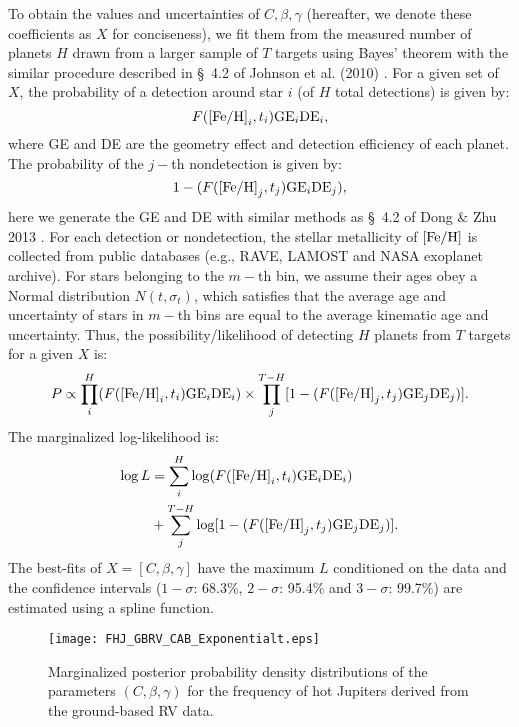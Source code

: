 \documentclass[twocolumn]{pnas-new}
\begin{document}
To obtain the values and uncertainties of $C, \beta, \gamma$ (hereafter, we denote these coefficients as $X$ for conciseness), we fit them from the measured number of planets $H$ drawn from a larger sample of $T$ targets using Bayes’ theorem with the similar procedure described in \S~4.2 of Johnson et al. (2010) \citep{2010PASP..122..905J}.
For a given set of $X$, the probability of a detection around star $i$ (of $H$ total detections) is given by:
\begin{equation*}
  F ({\rm [Fe/H]}_i, t_i) {\rm GE}_i {\rm DE}_{i},
\end{equation*}
where GE and DE are the geometry effect and detection efficiency of each planet.
The probability of the $j-$th nondetection is given by:
\begin{equation*}
  1-(F ({\rm [Fe/H]}_j, t_j) {\rm GE}_i {\rm DE}_{j}),
\end{equation*} 
here we generate the GE and DE with similar methods as \S~4.2 of Dong \& Zhu 2013 \citep{2013ApJ...778...53D}.
For each detection or nondetection, the stellar metallicity of $\rm [Fe/H]$ is collected from public databases (e.g., RAVE, LAMOST and NASA exoplanet archive).
For stars belonging to the $m-$th bin, we assume their ages obey a Normal distribution $N (t, \sigma_t)$, which satisfies that the average age and uncertainty of stars in $m-$th bins are equal to the average kinematic age and uncertainty.
Thus, the possibility/likelihood of detecting $H$ planets from $T$ targets for a given $X$ is:
\begin{equation}
  P \propto \prod \limits_{i}^{H} (F ({\rm [Fe/H]}_i, t_i) {\rm GE}_i {\rm DE}_{i}) \times \prod \limits_{j}^{T-H} [1-(F ({\rm [Fe/H]}_j, t_j) {\rm GE}_j {\rm DE}_{j})].
\end{equation}
The marginalized log-likelihood is:
\begin{equation}
\begin{split}
  \log L & = \sum \limits_{i}^{H} \log(F ({\rm [Fe/H]}_i, t_i) {\rm GE}_i {\rm DE}_{i}) \\
  & + \sum \limits_{j}^{T-H} \log[1-(F ({\rm [Fe/H]}_j, t_j) {\rm GE}_j {\rm DE}_{j})].
\end{split}
\end{equation}
The best-fits of $X=[C, \beta, \gamma]$ have the maximum $L$ conditioned on the data and the confidence intervals
($1-\sigma$: 68.3\%, $2-\sigma$: 95.4\% and $3-\sigma$: 99.7\%) are estimated using a spline function.

\begin{figure}[!t]
\centering
\texttt{[image: FHJ\_GBRV\_CAB\_Exponentialt.eps]}
\caption{Marginalized posterior probability density distributions of the parameters $(C, \beta, \gamma)$ for the frequency of hot Jupiters derived from the ground-based RV data.
\label{figFHJfittingFeHAgeGBRV}}
\end{figure}
\end{document}
